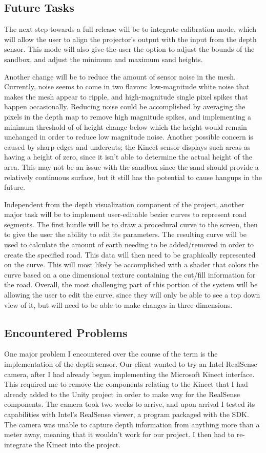 \documentclass[onecolumn, draftclsnofoot,10pt, compsoc]{IEEEtran}
\begin{document}
\subsection{Future Tasks}
The next step towards a full release will be to integrate calibration mode, which will allow the user to align the projector's output with the input from the depth sensor. This mode will also give the user the option to adjust the bounds of the sandbox, and adjust the minimum and maximum sand heights.

Another change will be to reduce the amount of sensor noise in the mesh. Currently, noise seems to come in two flavors: low-magnitude white noise that makes the mesh appear to ripple, and high-magnitude single pixel spikes that happen occasionally. Reducing noise could be accomplished by averaging the pixels in the depth map to remove high magnitude spikes, and implementing a minimum threshold of of height change below which the height would remain unchanged in order to reduce low magnitude noise. Another possible concern is caused by sharp edges and undercuts; the Kinect sensor displays such areas as having a height of zero, since it isn't able to determine the actual height of the area. This may not be an issue with the sandbox since the sand should provide a relatively continuous surface, but it still has the potential to cause hangups in the future.

Independent from the depth visualization component of the project, another major task will be to implement user-editable bezier curves to represent road segments. The first hurdle will be to draw a procedural curve to the screen, then to give the user the ability to edit its parameters. The resulting curve will be used to calculate the amount of earth needing to be added/removed in order to create the specified road. This data will then need to be graphically represented on the curve. This will most likely be accomplished with a shader that colors the curve based on a one dimensional texture containing the cut/fill information for the road. Overall, the most challenging part of this portion of the system will be allowing the user to edit the curve, since they will only be able to see a top down view of it, but will need to be able to make changes in three dimensions.

\subsection{Encountered Problems} 
One major problem I encountered over the course of the term is the implementation of the depth sensor. Our client wanted to try an Intel RealSense camera, after I had already begun implementing the Microsoft Kinect interface. This required me to remove the components relating to the Kinect that I had already added to the Unity project in order to make way for the RealSense components. The camera took two weeks to arrive, and upon arrival I tested its capabilities with Intel's RealSense viewer, a program packaged with the SDK. The camera was unable to capture depth information from anything more than a meter away, meaning that it wouldn't work for our project. I then had to re-integrate the Kinect into the project. 
\end{document}

